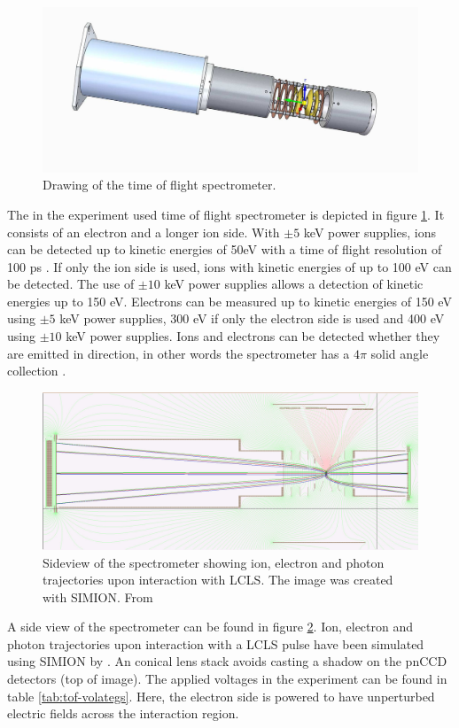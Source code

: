 \begin{figure}
   \includegraphics[width=0.9\linewidth]{images/spectrometer.jpg}
    \caption{Drawing of the time of flight spectrometer.}
\label{fig:spectrometer-detail}
\end{figure}
The in the experiment used time of flight spectrometer is depicted in figure \ref{fig:spectrometer-detail}. It consists of an electron and a longer ion side. With $\pm 5$ keV power supplies, ions can be detected up to kinetic energies of 50eV with a time of flight resolution of 100 ps \citep{Ferguson-2015-JSR}. If only the ion side is used, ions with kinetic energies of up to 100 eV can be detected. The use of $\pm 10$ keV power supplies allows a detection of kinetic energies up to 150 eV. Electrons can be measured up to kinetic energies of 150 eV using $\pm 5$ keV power supplies, 300 eV if only the electron side is used and 400 eV using $\pm 10$ keV power supplies. Ions and electrons can be detected whether they are emitted in direction, in other words the spectrometer has a $4\pi$ solid angle collection \citep{Osipov-2013-PC}.
\begin{figure}
   \includegraphics[width=0.9\linewidth]{images/simion.jpg}
    \caption[Sideview of the spectrometer showing ion, electron and photon trajectories.]{Sideview of the spectrometer showing ion, electron and photon trajectories upon interaction with LCLS. The image was created with SIMION. From \citep{Osipov-2013-PC}}
\label{fig:simion}
\end{figure}
A side view of the spectrometer can be found in figure \ref{fig:simion}. Ion, electron and photon trajectories upon interaction with a LCLS pulse have been simulated using SIMION by \citep{Osipov-2013-PC}. An conical lens stack avoids casting a shadow on the pnCCD detectors (top of image). The applied voltages in the experiment can be found in table \ref{tab:tof-volategs}. Here, the electron side is powered to have unperturbed electric fields across the interaction region.
